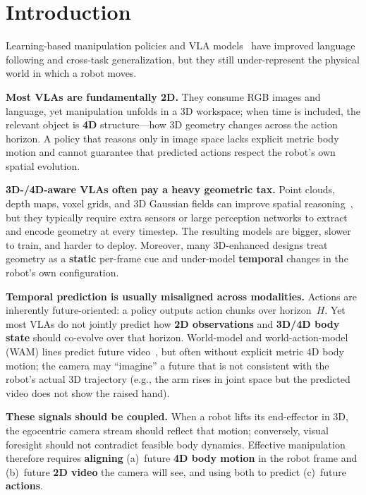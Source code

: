 
\section{Introduction}
\label{sec:intro}

Learning-based manipulation policies and VLA models~\cite{rt1,rt2,chi2023diffusion,zhao2023act,kim2024openvla,black2024pi0} have improved language following and cross-task generalization, but they still under-represent the physical world in which a robot moves.

\textbf{Most VLAs are fundamentally 2D.} They consume RGB images and language, yet manipulation unfolds in a 3D workspace; when time is included, the relevant object is \textbf{4D} structure---how 3D geometry changes across the action horizon. A policy that reasons only in image space lacks explicit metric body motion and cannot guarantee that predicted actions respect the robot's own spatial evolution.

\textbf{3D-/4D-aware VLAs often pay a heavy geometric tax.} Point clouds, depth maps, voxel grids, and 3D Gaussian fields can improve spatial reasoning~\cite{ze2024dp3,yang2025fp3,gervet2023act3d}, but they typically require extra sensors or large perception networks to extract and encode geometry at every timestep. The resulting models are bigger, slower to train, and harder to deploy. Moreover, many 3D-enhanced designs treat geometry as a \textbf{static} per-frame cue and under-model \textbf{temporal} changes in the robot's own configuration.

\textbf{Temporal prediction is usually misaligned across modalities.} Actions are inherently future-oriented: a policy outputs action chunks over horizon~$H$. Yet most VLAs do not jointly predict how \textbf{2D observations} and \textbf{3D/4D body state} should co-evolve over that horizon. World-model and world-action-model (WAM) lines predict future video~\cite{ha2018worldmodels,nvidia2026wam,lawam2026}, but often without explicit metric 4D body motion; the camera may ``imagine'' a future that is not consistent with the robot's actual 3D trajectory (e.g., the arm rises in joint space but the predicted video does not show the raised hand).

\textbf{These signals should be coupled.} When a robot lifts its end-effector in 3D, the egocentric camera stream should reflect that motion; conversely, visual foresight should not contradict feasible body dynamics. Effective manipulation therefore requires \textbf{aligning} (a)~future \textbf{4D body motion} in the robot frame and (b)~future \textbf{2D video} the camera will see, and using both to predict (c)~future \textbf{actions}.

